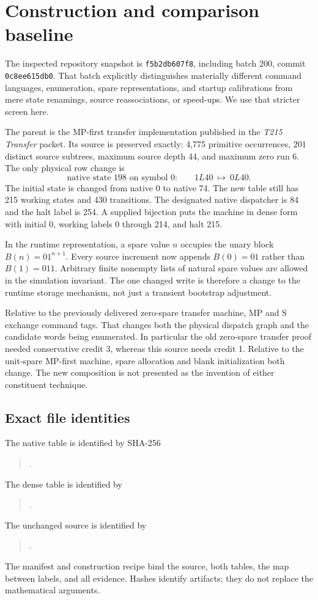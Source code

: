 \section{Construction and comparison baseline}
The inspected repository snapshot is \texttt{f5b2db607f8}, including batch 200, commit \texttt{0c8ee615db0}. That batch explicitly distinguishes materially different command languages, enumeration, spare representations, and startup calibrations from mere state renamings, source reassociations, or speed-ups. We use that stricter screen here.

The parent is the MP-first transfer implementation published in the \emph{T215 Transfer} packet. Its source is preserved exactly: 4,775 primitive occurrences, 201 distinct source subtrees, maximum source depth 44, and maximum zero run 6. The only physical row change is
\[
\text{native state 198 on symbol 0:}\qquad 1L40\ \longmapsto\ 0L40.
\]
The initial state is changed from native 0 to native 74. The new table still has 215 working states and 430 transitions. The designated native dispatcher is 84 and the halt label is 254. A supplied bijection puts the machine in dense form with initial 0, working labels 0 through 214, and halt 215.

In the runtime representation, a spare value $n$ occupies the unary block $B(n)=01^{n+1}$. Every source increment now appends $B(0)=01$ rather than $B(1)=011$. Arbitrary finite nonempty lists of natural spare values are allowed in the simulation invariant. The one changed write is therefore a change to the runtime storage mechanism, not just a transient bootstrap adjustment.

Relative to the previously delivered zero-spare transfer machine, MP and S exchange command tags. That changes both the physical dispatch graph and the candidate words being enumerated. In particular the old zero-spare transfer proof needed conservative credit 3, whereas this source needs credit 1. Relative to the unit-spare MP-first machine, spare allocation and blank initialization both change. The new composition is not presented as the invention of either constituent technique.

\subsection{Exact file identities}
The native table is identified by SHA-256
\begin{quote}\small{}.\end{quote}
The dense table is identified by
\begin{quote}\small{}.\end{quote}
The unchanged source is identified by
\begin{quote}\small{}.\end{quote}
The manifest and construction recipe bind the source, both tables, the map between labels, and all evidence. Hashes identify artifacts; they do not replace the mathematical arguments.

